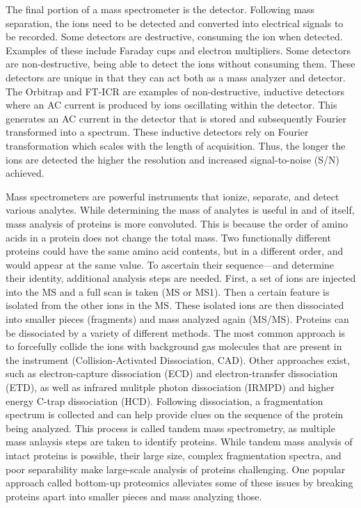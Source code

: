 The final portion of a mass spectrometer is the detector. Following mass separation, the ions need to be detected and converted into electrical signals to be recorded. Some detectors are destructive, consuming the ion when detected. Examples of these include Faraday cups and electron multipliers. Some detectors are non-destructive, being able to detect the ions without consuming them. These detectors are unique in that they can act both as a mass analyzer and detector. The Orbitrap and FT-ICR are examples of non-destructive, inductive detectors where an AC current is produced by ions oscillating within the detector. This generates an AC current in the detector that is stored and subsequently Fourier transformed into a \mz{} spectrum. These inductive detectors rely on Fourier transformation which scales with the length of acquisition. Thus, the longer the ions are detected the higher the resolution and increased signal-to-noise (S/N) achieved.

Mass spectrometers are powerful instruments that ionize, separate, and detect various analytes. While determining the mass of analytes is useful in and of itself, mass analysis of proteins is more convoluted. This is because the order of amino acids in a protein does not change the total mass. Two functionally different proteins could have the same amino acid contents, but in a different order, and would appear at the same \mz{} value. To ascertain their sequence---and determine their identity, additional analysis steps are needed. First, a set of ions are injected into the MS and a full scan is taken (MS or MS1). Then a certain \mz{} feature is isolated from the other ions in the MS. These isolated ions are then dissociated into smaller pieces (fragments) and mass analyzed again (MS/MS). Proteins can be dissociated by a variety of different methods. The most common approach is to forcefully collide the ions with background gas molecules that are present in the instrument (Collision-Activated Dissociation, CAD). Other approaches exist, such as electron-capture dissociation (ECD)\cite{ecd} and electron-transfer dissociation (ETD)\cite{etd}, as well as infrared mulitple photon dissociation (IRMPD)\cite{irmpd} and higher energy C-trap dissociation (HCD)\cite{hcd}. Following dissociation, a fragmentation spectrum is collected and can help provide clues on the sequence of the protein being analyzed. This process is called tandem mass spectrometry, as multiple mass anlaysis steps are taken to identify proteins. While tandem mass analysis of intact proteins is possible, their large size, complex fragmentation spectra, and poor separability make large-scale analysis of proteins challenging. One popular approach called bottom-up proteomics alleviates some of these issues by breaking proteins apart into smaller pieces and mass analyzing those.


